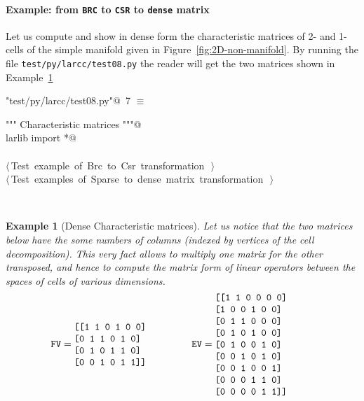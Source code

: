 \documentclass[11pt,oneside]{article}    %
\newtheorem{example}{Example}
\begin{document}
\paragraph{Example: from \texttt{BRC} to \texttt{CSR} to \texttt{dense} matrix} 
Let us compute and show in dense form the characteristic matrices of 2- and 1-cells of the simple manifold given in Figure~\ref{fig:2D-non-manifold}.
By running the file \texttt{test/py/larcc/test08.py} the reader will get the two matrices shown in Example~\ref{ex:denseMat}
\begin{flushleft} \small
\begin{minipage}{\linewidth} \label{scrap13}
\protect{}\verb@"test/py/larcc/test08.py"@\nobreak\ {\footnotesize 7 }$\equiv$
\vspace{-1ex}
\begin{list}{}{} \item
\mbox{}\verb@""" Characteristic matrices """@\\
\mbox{}\verb@from larlib import *@\\
\mbox{}\verb@@\\
\mbox{}\verb@@\hbox{$\langle\,$Test example of Brc to Csr transformation\nobreak\ {\footnotesize {}}$\,\rangle$}\verb@@\\
\mbox{}\verb@@\hbox{$\langle\,$Test examples of Sparse to dense matrix transformation\nobreak\ {\footnotesize {}}$\,\rangle$}\verb@@\\
\mbox{}\verb@@{\NWsep}
\end{list}
\vspace{-2ex}
\end{minipage}\\[4ex]
\end{flushleft}
 
\begin{example}[Dense Characteristic matrices]\label{ex:denseMat}
Let us notice that the two matrices below have the some numbers of columns (indexed by vertices of the cell decomposition).
This very fact allows to multiply one matrix for the other transposed, and hence to compute the matrix form of linear operators between the spaces of cells of various dimensions.
\[
\texttt{FV} =
\begin{minipage}[c]{0.29\linewidth}
\begin{verbatim}
[[1 1 0 1 0 0]
 [0 1 1 0 1 0]
 [0 1 0 1 1 0]
 [0 0 1 0 1 1]]
\end{verbatim}
\end{minipage}
\qquad
\texttt{EV} =
\begin{minipage}[c]{0.29\linewidth}
\begin{verbatim}
[[1 1 0 0 0 0]
 [1 0 0 1 0 0]
 [0 1 1 0 0 0]
 [0 1 0 1 0 0]
 [0 1 0 0 1 0]
 [0 0 1 0 1 0]
 [0 0 1 0 0 1]
 [0 0 0 1 1 0]
 [0 0 0 0 1 1]]
\end{verbatim}
\end{minipage}
\]
\end{example}
\end{document}
